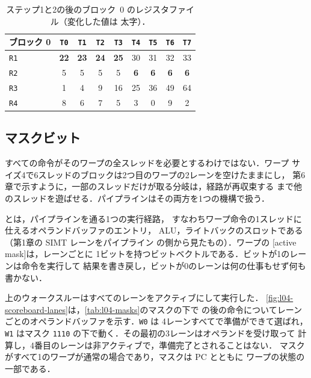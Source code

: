 \documentclass[../main.tex]{subfiles}
\begin{document}
\begin{table}[htbp]
  \centering
  \caption{ステップ1と2の後のブロック~0 のレジスタファイル（変化した値は
    太字）．}
  \label{tab:l04-walkthrough-after}
  \begin{tabular}{lcccccccc}
    \toprule
    ブロック 0 & \texttt{T0} & \texttt{T1} & \texttt{T2} & \texttt{T3} & \texttt{T4} & \texttt{T5} & \texttt{T6} & \texttt{T7} \\
    \midrule
    \texttt{R1} & \textbf{22} & \textbf{23} & \textbf{24} & \textbf{25} & 30 & 31 & 32 & 33 \\
    \texttt{R2} &  5 &  5 &  5 &  5 & \textbf{6} & \textbf{6} & \textbf{6} & \textbf{6} \\
    \texttt{R3} &  1 &  4 &  9 & 16 & 25 & 36 & 49 & 64 \\
    \texttt{R4} &  8 &  6 &  7 &  5 &  3 &  0 &  9 &  2 \\
    \bottomrule
  \end{tabular}
\end{table}

\subsection{マスクビット}

すべての命令がそのワープの全スレッドを必要とするわけではない．ワープ
サイズ4で6スレッドのブロックは2つ目のワープの2レーンを空けたままにし，
第6章で示すように，一部のスレッドだけが取る分岐は，経路が再収束する
まで他のスレッドを遊ばせる．パイプラインはその両方を1つの機構で扱う．

\begin{definition}[レーンとアクティブマスク]
  \label{def:l04-active-mask}
  とは，パイプラインを通る1つの実行経路，
  すなわちワープ命令の1スレッドに仕えるオペランドバッファのエントリ，
  ALU，ライトバックのスロットである（第1章の SIMT レーンをパイプライン
  の側から見たもの）．ワープの
  [active mask]は，レーンごとに
  1ビットを持つビットベクトルである．ビットが1のレーンは命令を実行して
  結果を書き戻し，ビットが0のレーンは何の仕事もせず何も書かない．
\end{definition}

上のウォークスルーはすべてのレーンをアクティブにして実行した．
\cref{fig:l04-scoreboard-lanes}は，\cref{tab:l04-masks}のマスクの下で
の後の命令についてレーンごとのオペランドバッファを示す．\texttt{W0} は
4レーンすべてで準備ができて選ばれ，\texttt{W1} はマスク
\texttt{1110} の下で動く．その最初の3レーンはオペランドを受け取って
計算し，4番目のレーンは非アクティブで，準備完了とされることはない．
マスクがすべて1のワープが通常の場合であり，マスクは PC とともに
ワープの状態の一部である．
\end{document}
